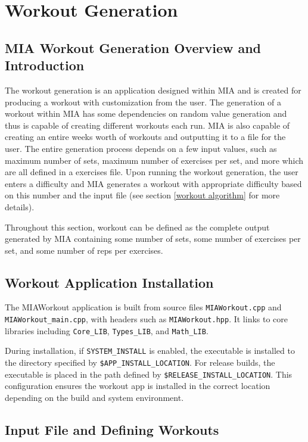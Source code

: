 \chapter{Workout Generation} \label{workout}
\pagestyle{fancy}

\section{MIA Workout Generation Overview and Introduction}

The workout generation is an application designed within MIA and is created for producing a workout with customization from the user. The generation of a workout within MIA has some dependencies on random value generation and thus is capable of creating different workouts each run. MIA is also capable of creating an entire weeks worth of workouts and outputting it to a file for the user. The entire generation process depends on a few input values, such as maximum number of sets, maximum number of exercises per set, and more which are all defined in a exercises file. Upon running the workout generation, the user enters a difficulty and MIA generates a workout with appropriate difficulty based on this number and the input file (see section \ref{workout algorithm} for more details).  

Throughout this section, workout can be defined as the complete output generated by MIA containing some number of sets, some number of exercises per set, and some number of reps per exercises.

\section{Workout Application Installation}

The MIAWorkout application is built from source files \texttt{MIAWorkout.cpp} and \texttt{MIAWorkout\_main.cpp}, with headers such as \texttt{MIAWorkout.hpp}. It links to core libraries including \texttt{Core\_LIB}, \texttt{Types\_LIB}, and \texttt{Math\_LIB}. 

During installation, if \texttt{SYSTEM\_INSTALL} is enabled, the executable is installed to the directory specified by \texttt{\${APP\_INSTALL\_LOCATION}}. For release builds, the executable is placed in the path defined by \texttt{\${RELEASE\_INSTALL\_LOCATION}}. This configuration ensures the workout app is installed in the correct location depending on the build and system environment.


\section{Input File and Defining Workouts}

